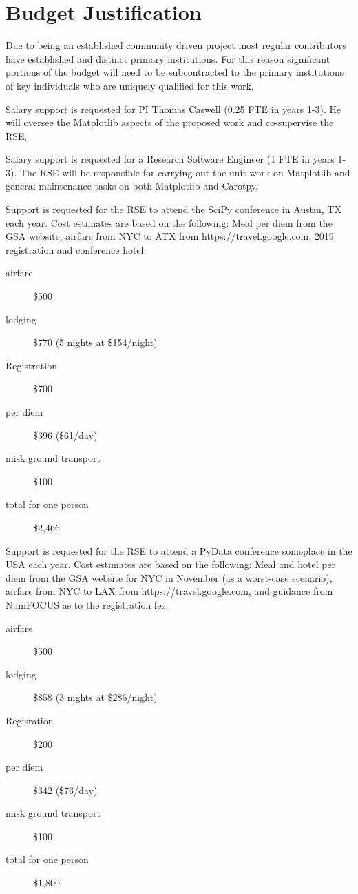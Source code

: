 \documentclass[12pt]{article}
\numberwithin{page}{section}
\begin{document}
\newpage
\section{Budget Justification}
\setcounter{page}{1}

Due to being an established community driven project most regular
contributors have established and distinct primary institutions.  For
this reason significant portions of the budget will need to be
subcontracted to the primary institutions of key individuals who are
uniquely qualified for this work.

Salary support is requested for PI Thomas Caswell (0.25 FTE in years
1-3).  He will oversee the Matplotlib aspects of the proposed work and
co-supervise the RSE.

Salary support is requested for a Research Software Engineer (1 FTE in
years 1-3).  The RSE will be responsible for carrying out the unit
work on Matplotlib and general maintenance tasks on both Matplotlib
and Carotpy.

Support is requested for the RSE to attend the SciPy conference in
Austin, TX each year.  Cost estimates are based on the following: Meal
per diem from the GSA website, airfare from NYC to ATX from
\url{https://travel.google.com}, 2019 registration and conference hotel.

\begin{description}
\item[airfare] \$500
\item [lodging] \$770 (5 nights at \$154/night)
\item [Registration] \$700
\item [per diem] \$396 (\$61/day)
\item [misk ground transport] \$100
\item [total for one person] \$2,466
\end{description}

Support is requested for the RSE to attend a PyData conference
someplace in the USA each year.  Cost estimates are based on the
following: Meal and hotel per diem from the GSA website for NYC in
November (as a worst-case scenario), airfare from NYC to LAX from
\url{https://travel.google.com}, and guidance from NumFOCUS as to the
registration fee.


\begin{description}
\item [airfare] \$500
\item [lodging] \$858 (3 nights at \$286/night)
\item [Regisration] \$200
\item [per diem] \$342 (\$76/day)
\item [misk ground transport] \$100
\item [total for one person] \$1,800
\end{description}
\end{document}
